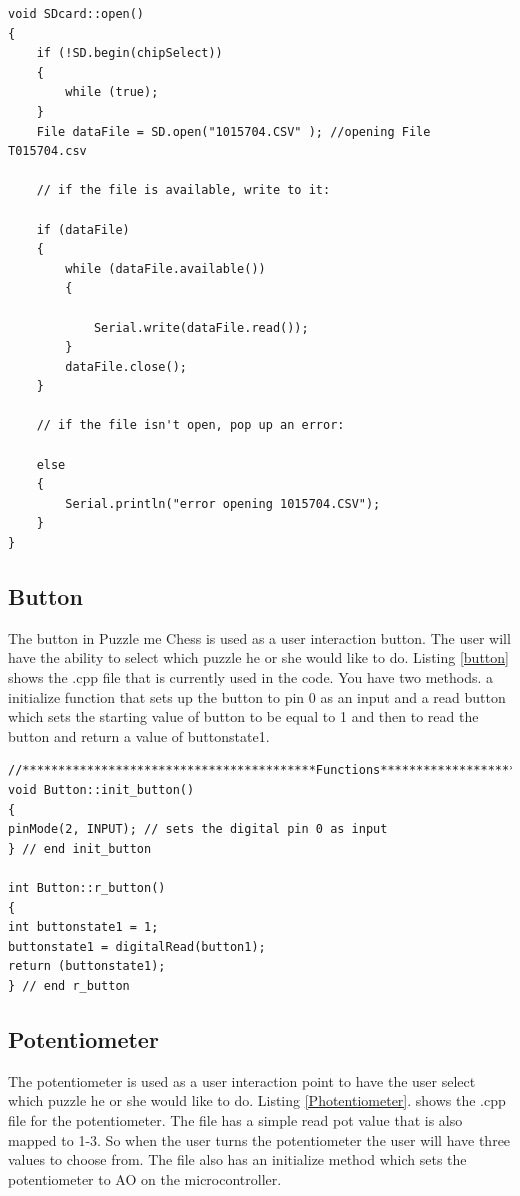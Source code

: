 \documentclass[11pt]{article}
\begin{document}
\begin{lstlisting}[caption={Puzzle me Chess - SDcard.cpp file},label={sdcard1}]
void SDcard::open()
{
    if (!SD.begin(chipSelect))
    {
        while (true);
    }
    File dataFile = SD.open("1015704.CSV" ); //opening File T015704.csv

    // if the file is available, write to it:

    if (dataFile)
    {
        while (dataFile.available())
        {

            Serial.write(dataFile.read());
        }
        dataFile.close();
    }

    // if the file isn't open, pop up an error:

    else
    {
        Serial.println("error opening 1015704.CSV");
    }
}
\end{lstlisting}

\subsection{Button}
The button in Puzzle me Chess is used as a user interaction button. The user will have the ability to select which puzzle he or she would like to do. Listing \ref{button} shows the .cpp file that is currently used in the code. You have two methods. a initialize function that sets up the button to pin 0 as an input and a read button which sets the starting value of button to be equal to 1 and then to read the button and return a value of buttonstate1. 

\begin{lstlisting}[caption={Puzzle me Chess - button.cpp file},label={button}]
//*****************************************Functions**************************//
void Button::init_button()
{
pinMode(2, INPUT); // sets the digital pin 0 as input
} // end init_button

int Button::r_button()
{
int buttonstate1 = 1; 
buttonstate1 = digitalRead(button1);
return (buttonstate1);
} // end r_button
\end{lstlisting}

\subsection{Potentiometer}
The potentiometer is used as a user interaction point to have the user select which puzzle he or she would like to do. Listing \ref{Photentiometer}. shows the .cpp file for the potentiometer. The file has a simple read pot value that is also mapped to 1-3. So when the user turns the potentiometer the user will have three values to choose from. The file also has an initialize method which sets the potentiometer to AO on the microcontroller. 
\end{document}
